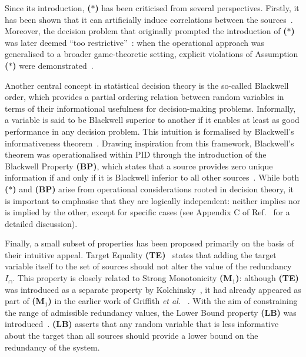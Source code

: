 \documentclass{article}
\makeatletter
\newcommand{\etal}{\textit{et al.\@} }
\newcommand{\ts}[1]{\ensuremath{_{\text{#1}}}}
\newcommand{\Ic}{\ensuremath{I_\cap}\xspace}
\newcommand{\Mo}{\textbf{(M\ts{1})}\xspace} %
\newcommand{\BP}{\textbf{(BP)}\xspace} %
\newcommand{\TE}{\textbf{(TE)}\xspace} %
\newcommand{\AST}{\textbf{($\boldsymbol{\ast}$)}\xspace} %
\newcommand{\LB}{\textbf{(LB)}\xspace} %
\makeatother
\begin{document}

Since its introduction, \AST has been criticised from several perspectives. Firstly, it has been shown that it can artificially induce correlations between the sources~\cite{james2018uniquekey}. Moreover, the decision problem that originally prompted the introduction of \AST was later deemed ``too restrictive''~\cite{ince2017measuring}: when the operational approach was generalised to a broader game-theoretic setting, explicit violations of Assumption \AST were demonstrated~\cite{ince2017measuring}.

Another central concept in statistical decision theory is the so-called Blackwell order, which provides a partial ordering relation between random variables in terms of their informational usefulness for decision-making problems. Informally, a variable is said to be Blackwell superior to another if it enables at least as good performance in any decision problem. This intuition is formalised by Blackwell’s informativeness theorem~\cite{blackwell1953equivalent}. Drawing inspiration from this framework, Blackwell's theorem was operationalised within PID through the introduction of the Blackwell Property \BP, which states that a source provides zero unique information if and only if it is Blackwell inferior to all other sources~\cite{venkatesh2022partial, kolchinsky2022novel, mages2023decomposing}. While both \AST and \BP arise from operational considerations rooted in decision theory, it is important to emphasise that they are logically independent: neither implies nor is implied by the other, except for specific cases (see Appendix C of Ref.~\cite{venkatesh2022partial} for a detailed discussion).


Finally, a small subset of properties has been proposed primarily on the basis of their intuitive appeal. Target Equality \TE~\cite{griffith2014intersection, kolchinsky2022novel} states that adding the target variable itself to the set of sources should not alter the value of the redundancy \Ic. This property is closely related to Strong Monotonicity \Mo: although \TE was introduced as a separate property by Kolchinsky~\cite{kolchinsky2022novel}, it had already appeared as part of \Mo in the earlier work of Griffith \etal~\cite{griffith2014intersection}. With the aim of constraining the range of admissible redundancy values, the Lower Bound property \LB was introduced~\cite{griffith2014intersection}. \LB asserts that any random variable that is less informative about the target than all sources should provide a lower bound on the redundancy of the system. 
\end{document}
